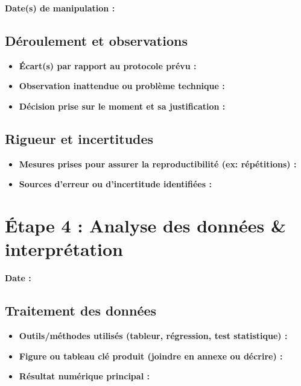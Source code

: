 \documentclass[11pt, a4paper]{article}
\begin{document}
\medskip

\textbf{Date(s) de manipulation :}

\medskip

\subsection{Déroulement et observations}
\begin{itemize}
    \item[$\bullet$] \textbf{Écart(s) par rapport au protocole prévu :}
    \item[$\bullet$] \textbf{Observation inattendue ou problème technique :}
    \item[$\bullet$] \textbf{Décision prise sur le moment et sa justification :}
\end{itemize}

\subsection{Rigueur et incertitudes}
\begin{itemize}
    \item[$\bullet$] \textbf{Mesures prises pour assurer la reproductibilité (ex: répétitions) :}
    \item[$\bullet$] \textbf{Sources d'erreur ou d'incertitude identifiées :}
\end{itemize}

\newpage
\section{Étape 4 : Analyse des données \& interprétation}

\medskip

\textbf{Date :}

\medskip

\subsection{Traitement des données}
\begin{itemize}
    \item[$\bullet$] \textbf{Outils/méthodes utilisés (tableur, régression, test statistique) :}
    \item[$\bullet$] \textbf{Figure ou tableau clé produit (joindre en annexe ou décrire) :}
    \item[$\bullet$] \textbf{Résultat numérique principal :}
\end{itemize}
\end{document}
